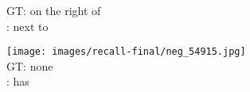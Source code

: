 \documentclass[10pt,twocolumn,letterpaper]{article}
\begin{document}
\begin{figure*}[t]
\begin{minipage}[b]{0.18\textwidth}
      	\vspace{0.2ex}
      	\small{
       	GT: on the right of\\
       	\cite{Lu16}: next to
       	}
       	\vspace{0.3ex}
    \end{minipage}
    \hspace{0.005\textwidth}
\begin{minipage}[b]{0.18\textwidth}
    	\centering
       	\texttt{[image: images/recall-final/neg\_54915.jpg]} \\
       	\vspace{0.2ex}
       	\small{
       	GT: none\\
       	\cite{Lu16}: has
       	}
       	\vspace{0.3ex}
    \end{minipage}
     	

\end{figure*}
\end{document}
